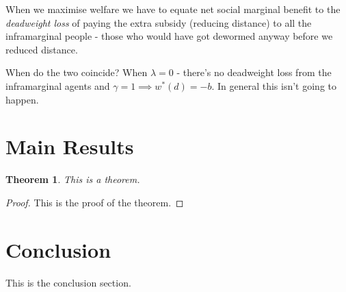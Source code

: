 \documentclass{article}
\newtheorem{theorem}{Theorem}
\begin{document}
When we maximise welfare we have to equate net social marginal benefit to the \emph{deadweight loss} of paying the 
extra subsidy (reducing distance) to all the inframarginal people - those who would have got dewormed 
anyway before we reduced distance.

When do the two coincide? When $\lambda = 0$ - there's no deadweight loss from the inframarginal 
agents and $\gamma = 1 \implies w^*(d) = -b$. In general this isn't going to happen.

\section{Main Results}

\begin{theorem}
This is a theorem.
\end{theorem}

\begin{proof}
This is the proof of the theorem.
\end{proof}

\section{Conclusion}
This is the conclusion section.
\end{document}
